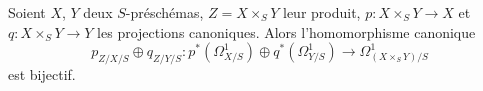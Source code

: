 \begin{proposition}[16.4.23]
\label{IV.16.4.23}
Soient $X$, $Y$ deux $S$-préschémas, $Z=X\times_S Y$ leur produit,
$p:X\times_S Y\to X$ et $q:X\times_S Y\to Y$ les projections canoniques.
Alors l'homomorphisme canonique
\[
  p_{Z/X/S}\oplus q_{Z/Y/S}:
  p^*(\Omega_{X/S}^1)\oplus q^*(\Omega_{Y/S}^1)
  \longrightarrow\Omega_{(X\times_S Y)/S}^1
  \tag{16.4.23.1}
  \label{IV.16.4.23.1}
\]
est bijectif.
\end{proposition}

